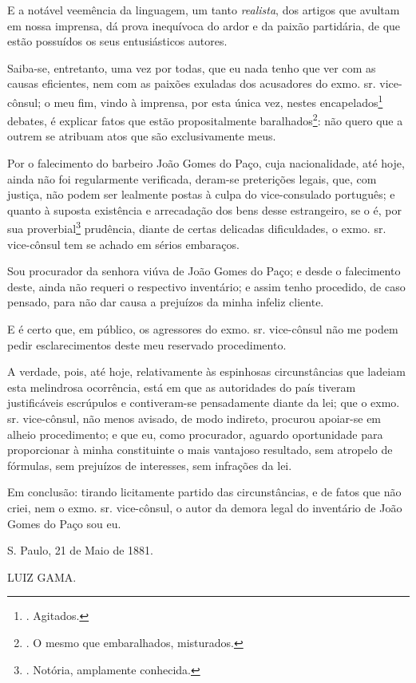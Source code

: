 E a notável veemência da linguagem, um tanto \emph{realista}, dos
artigos que avultam em nossa imprensa, dá prova inequívoca do ardor e da
paixão partidária, de que estão possuídos os seus entusiásticos autores.

Saiba-se, entretanto, uma vez por todas, que eu nada tenho que ver com
as causas eficientes, nem com as paixões exuladas dos acusadores do
exmo. sr. vice-cônsul; o meu fim, vindo à imprensa, por esta única vez,
nestes encapelados\footnote{. Agitados.} debates, é explicar fatos que
estão propositalmente baralhados\footnote{. O mesmo que embaralhados,
  misturados.}: não quero que a outrem se atribuam atos que são
exclusivamente meus.

Por o falecimento do barbeiro João Gomes do Paço, cuja nacionalidade,
até hoje, ainda não foi regularmente verificada, deram-se preterições
legais, que, com justiça, não podem ser lealmente postas à culpa do
vice-consulado português; e quanto à suposta existência e arrecadação
dos bens desse estrangeiro, se o é, por sua proverbial\footnote{.
  Notória, amplamente conhecida.} prudência, diante de certas delicadas
dificuldades, o exmo. sr. vice-cônsul tem se achado em sérios embaraços.

Sou procurador da senhora viúva de João Gomes do Paço; e desde o
falecimento deste, ainda não requeri o respectivo inventário; e assim
tenho procedido, de caso pensado, para não dar causa a prejuízos da
minha infeliz cliente.

E é certo que, em público, os agressores do exmo. sr. vice-cônsul não me
podem pedir esclarecimentos deste meu reservado procedimento.

A verdade, pois, até hoje, relativamente às espinhosas circunstâncias
que ladeiam esta melindrosa ocorrência, está em que as autoridades do
país tiveram justificáveis escrúpulos e contiveram-se pensadamente
diante da lei; que o exmo. sr. vice-cônsul, não menos avisado, de modo
indireto, procurou apoiar-se em alheio procedimento; e que eu, como
procurador, aguardo oportunidade para proporcionar à minha constituinte
o mais vantajoso resultado, sem atropelo de fórmulas, sem prejuízos de
interesses, sem infrações da lei.

Em conclusão: tirando licitamente partido das circunstâncias, e de fatos
que não criei, nem o exmo. sr. vice-cônsul, o autor da demora legal do
inventário de João Gomes do Paço sou eu.

S. Paulo, 21 de Maio de 1881.

LUIZ GAMA.

